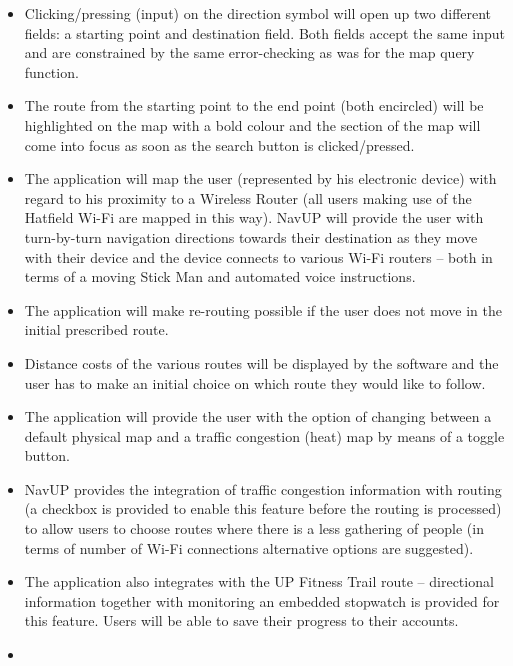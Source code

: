 \documentclass[runningheads,a4paper]{llncs}
\begin{document}
\begin{itemize}

\item Clicking/pressing (input) on the direction symbol will open up two different fields: a starting point and destination field. Both fields accept the same input and are constrained by the same error-checking as was for the map query function.

\item The route from the starting point to the end point (both encircled) will be highlighted on the map with a bold colour and the section of the map will come into focus as soon as the search button is clicked/pressed.

\item The application will map the user (represented by his electronic device) with regard to his proximity to a Wireless Router (all users making use of the Hatfield Wi-Fi are mapped in this way). NavUP will provide the user with turn-by-turn navigation directions towards their destination as they move with their device and the device connects to various Wi-Fi routers – both in terms of a moving Stick Man and automated voice instructions.

\item The application will make re-routing possible if the user does not move in the initial prescribed route.

\item Distance costs of the various routes will be displayed by the software and the user has to make an initial choice on which route they would like to follow.

\item The application will provide the user with the option of changing between a default physical map and a traffic congestion (heat) map by means of a toggle button.

\item NavUP provides the integration of traffic congestion information with routing (a checkbox is provided to enable this feature before the routing is processed) to allow users to choose routes where there is a less gathering of people (in terms of number of Wi-Fi connections alternative options are suggested).

\item The application also integrates with the UP Fitness Trail route – directional information together with monitoring an embedded stopwatch is provided for this feature. Users will be able to save their progress to their accounts.

\item 

\end{itemize}
\end{document}
